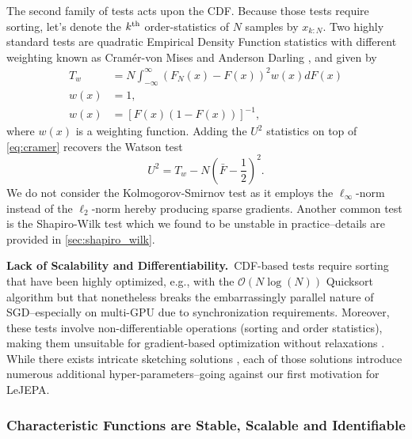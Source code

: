 The second family of tests acts upon the CDF. Because those tests require sorting, let's denote the $k^{\rm th}$ order-statistics of $N$ samples by $x_{k:N}$. Two highly standard tests are quadratic Empirical Density Function statistics with different weighting known as Cramér-von Mises \citep{cramer1928composition,von1981probability} and Anderson Darling \citep{anderson1952asymptotic}, and given by
\begin{align}
    T_{w}&=N \int_{-\infty}^{\infty}\left(F_{N}(x)-F(x)\right)^{2} w(x) d F(x)\nonumber\\
    w(x)&=1,\tag{Cramér-von Mises}\label{eq:cramer}\\
    w(x)&=[F(x)(1-F(x))]^{-1}, \tag{Anderson-Darling}\label{eq:anderson_darling}
\end{align}
where $w(x)$ is a weighting function. Adding the $U^2$ statistics on top of \cref{eq:cramer} recovers the Watson test \citep{watson1961goodness}
\begin{equation}
    U^{2}=T_{w}-N\left(\bar{F}-\frac{1}{2}\right)^{2}.\tag{Watson} \label{eq:watson}
\end{equation}
We do not consider the Kolmogorov-Smirnov test \citep{kolmogorov1933} as it employs the $\ell_{\infty}$-norm instead of the $\ell_2$-norm hereby producing sparse gradients. Another common test is the Shapiro-Wilk test \citep{shapiro1965analysis} which we found to be unstable in practice--details are provided in \cref{sec:shapiro_wilk}.



{\bf Lack of Scalability and Differentiability.}~CDF-based tests require sorting that have been highly optimized, e.g., with the $\mathcal{O}(N \log (N))$ Quicksort algorithm \citep{quicksort} but that nonetheless breaks the embarrassingly parallel 
nature of SGD--especially on multi-GPU \citep{tanasic2013comparison,maltenberger2022evaluating} due to synchronization requirements. Moreover, these tests involve non-differentiable operations (sorting and 
order statistics), making them unsuitable for gradient-based optimization 
without relaxations \citep{cuturi2019differentiable,grover2019stochastic,petersen2022monotonic}. While there exists intricate sketching solutions \citep{dunning2019computing,masson2019ddsketch,dunning2021t}, each of those solutions introduce numerous additional hyper-parameters--going against our first motivation for LeJEPA.



\subsubsection{Characteristic Functions are Stable, Scalable and Identifiable}
\label{sec:cf_tests}

